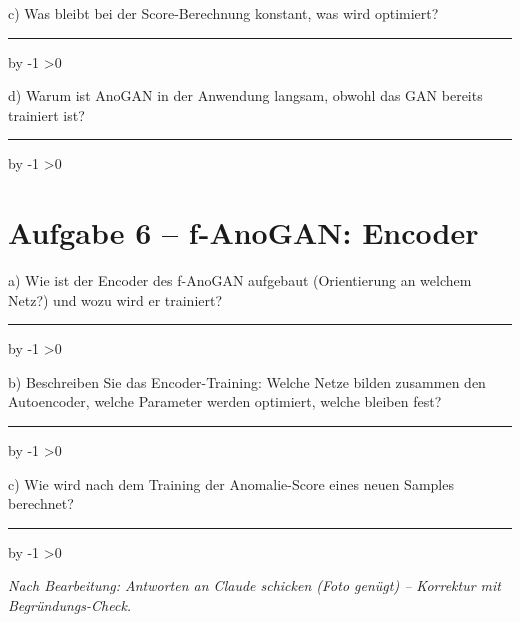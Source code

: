 \documentclass[10pt,a4paper]{article}
\newcommand{\antwortlinien}[1]{%
  \par\vspace{2pt}%
  \newcount\zeilen \zeilen=#1
  \loop
    \noindent\rule{\linewidth}{0.4pt}\par\vspace{11pt}%
    \advance\zeilen by -1
  \ifnum\zeilen>0 \repeat
}
\begin{document}
c) Was bleibt bei der Score-Berechnung konstant, was wird optimiert?
\antwortlinien{2}

d) Warum ist AnoGAN in der Anwendung langsam, obwohl das GAN bereits trainiert ist?
\antwortlinien{2}

\section*{Aufgabe 6 -- f-AnoGAN: Encoder}

a) Wie ist der Encoder des f-AnoGAN aufgebaut (Orientierung an welchem Netz?) und
wozu wird er trainiert?
\antwortlinien{3}

b) Beschreiben Sie das Encoder-Training: Welche Netze bilden zusammen den
\glqq Autoencoder\grqq, welche Parameter werden optimiert, welche bleiben fest?
\antwortlinien{4}

c) Wie wird nach dem Training der Anomalie-Score eines neuen Samples berechnet?
\antwortlinien{2}

\vspace{10pt}
\begin{center}
\footnotesize\itshape
Nach Bearbeitung: Antworten an Claude schicken (Foto genügt) -- Korrektur mit Begründungs-Check.
\end{center}
\end{document}
